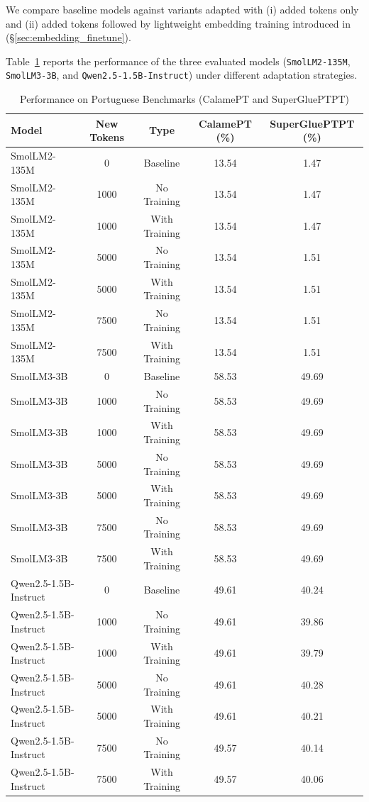 We compare baseline models against variants adapted with (i) added tokens only and (ii) added tokens followed by lightweight embedding training introduced in (\S\ref{sec:embedding_finetune}). 


Table~\ref{tab:benchmark-results} reports the performance of the three evaluated models (\texttt{SmolLM2-135M}, \texttt{SmolLM3-3B}, and \texttt{Qwen2.5-1.5B-Instruct}) under different adaptation strategies.

\begin{table}[H]
\centering
\begin{tabular}{lcccc}
\hline
\textbf{Model} & \textbf{New Tokens} & \textbf{Type} & \textbf{CalamePT (\%)} & \textbf{SuperGluePTPT (\%)} \\
\hline
SmolLM2-135M & 0     & Baseline      & 13.54 & 1.47 \\
SmolLM2-135M & 1000  & No Training   & 13.54 & 1.47 \\
SmolLM2-135M & 1000  & With Training & 13.54 & 1.47 \\
SmolLM2-135M & 5000  & No Training   & 13.54 & 1.51 \\
SmolLM2-135M & 5000  & With Training & 13.54 & 1.51 \\
SmolLM2-135M & 7500  & No Training   & 13.54 & 1.51 \\
SmolLM2-135M & 7500  & With Training & 13.54 & 1.51 \\
\hline
SmolLM3-3B   & 0     & Baseline      & 58.53 & 49.69 \\
SmolLM3-3B   & 1000  & No Training   & 58.53 & 49.69 \\
SmolLM3-3B   & 1000  & With Training & 58.53 & 49.69 \\
SmolLM3-3B   & 5000  & No Training   & 58.53 & 49.69 \\
SmolLM3-3B   & 5000  & With Training & 58.53 & 49.69 \\
SmolLM3-3B   & 7500  & No Training   & 58.53 & 49.69 \\
SmolLM3-3B   & 7500  & With Training & 58.53 & 49.69 \\
\hline
Qwen2.5-1.5B-Instruct & 0     & Baseline      & 49.61 & 40.24 \\
Qwen2.5-1.5B-Instruct & 1000  & No Training   & 49.61 & 39.86 \\
Qwen2.5-1.5B-Instruct & 1000  & With Training & 49.61 & 39.79 \\
Qwen2.5-1.5B-Instruct & 5000  & No Training   & 49.61 & 40.28 \\
Qwen2.5-1.5B-Instruct & 5000  & With Training & 49.61 & 40.21 \\
Qwen2.5-1.5B-Instruct & 7500  & No Training   & 49.57 & 40.14 \\
Qwen2.5-1.5B-Instruct & 7500  & With Training & 49.57 & 40.06 \\
\hline
\end{tabular}
\caption{Performance on Portuguese Benchmarks (CalamePT and SuperGluePTPT)}
\label{tab:benchmark-results}
\end{table}

